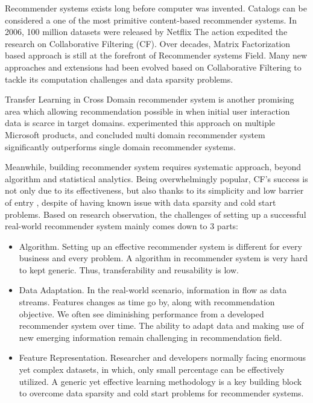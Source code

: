 Recommender systems exists long before computer was invented. Catalogs can be considered a one of the most primitive content-based recommender systems. In 2006, 100 million datasets were released by Netflix \citep{Bennett2007} The action expedited the research on Collaborative Filtering (CF). Over decades, Matrix Factorization based approach is still at the forefront of Recommender systems Field. Many new approaches and extensions had been evolved based on Collaborative Filtering to tackle its computation challenges and data sparsity problems. 

Transfer Learning \citep{Pan2010} in Cross Domain recommender system is another promising area which allowing recommendation possible in when initial user interaction data is scarce in target domains. \citet{Elkahky2015} experimented this approach on multiple Microsoft products, and concluded multi domain recommender system significantly outperforms single domain recommender systems. 

Meanwhile, building recommender system requires systematic approach, beyond algorithm and statistical analytics. Being overwhelmingly popular, CF's success is not only due to its effectiveness, but also thanks to its simplicity and low barrier of entry \citep{Amatriain2016}, despite of having known issue with data sparsity and cold start problems. Based on research observation, the challenges of setting up a successful real-world recommender system mainly comes down to 3 parts:  

\begin{itemize}
\item Algorithm. Setting up an effective recommender system is different for every business and every problem. A algorithm in recommender system is very hard to kept generic. Thus, transferability and reusability is low.

\item Data Adaptation. In the real-world scenario, information in flow as data streams. Features changes as time go by, along with recommendation objective. We often see diminishing performance from a developed recommender system over time. The ability to adapt data and making use of new emerging information remain challenging in recommendation field.

\item Feature Representation. Researcher and developers normally facing enormous yet complex datasets, in which, only small percentage can be effectively utilized. A generic yet effective learning methodology is a key building block to overcome data sparsity and cold start problems for recommender systems.
\end{itemize}

